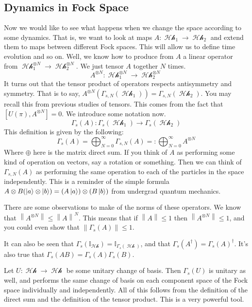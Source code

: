 \documentclass{article}
\DeclareMathOperator{\Hh}{\mathcal{Hh}}
\renewcommand{\norm}[1]{\left\lVert#1\right\rVert}
\begin{document}
\subsection{Dynamics in Fock Space}
Now we would like to see what happens when we change the space according to some dynamics. That is, we want to look at maps $A : \Hh_1 \to \Hh_2$ and extend them to maps between different Fock spaces. This will allow us to define time evolution and so on. Well, we know how to produce from $A$ a linear operator from $\Hh_1^{\otimes N} \to \Hh_2^{\otimes N}$. We just tensor $A$ together $N$ times.
\[A^{\otimes N} : \Hh^{\otimes N}_1 \to \Hh_2^{\otimes N}\]
It turns out that the tensor product of operators respects antisymmetry and symmetry. That is to say, $A^{\otimes N}(\Gamma_{s,N}(\Hh_1)) = \Gamma_{s,N}(\Hh_2)$. You may recall this from previous studies of tensors. This comes from the fact that $[U(\pi),A^{\otimes N}] = 0$. We introduce some notation now.
\begin{equation}
\Gamma_{s}(A) : \Gamma_{s}(\Hh_1) \to \Gamma_s(\Hh_2)
\end{equation}
This definition is given by the following:
\begin{equation}
\Gamma_s(A) = \bigoplus_{N=0}^\infty \Gamma_{s,N}(A) =: \bigoplus_{N=0}^\infty A^{\otimes N}
\end{equation}
Where $\oplus$ here is the matrix direct sum. If you think of $A$ as performing some kind of operation on vectors, say a rotation or something. Then we can think of $\Gamma_{s,N}(A)$ as performing the same operation to each of the particles in the space independently. This is a reminder of the simple formula $A\otimes B(\ket{a}\otimes\ket{b}) = (A\ket{a})\otimes(B\ket{b})$ from undergrad quantum mechanics.

There are some observations to make of the norms of these operators. We know that $\norm{A^{\otimes N}} \leq \norm{A}^N$. This means that if $\norm{A} \leq 1$ then $\norm{A^{\otimes N}} \leq 1$, and you could even show that $\norm{\Gamma_s(A)} \leq 1$.

It can also be seen that $\Gamma_s(\mathbb{I}_{\Hh}) = \mathbb{I}_{\Gamma_s(\Hh)}$, and that $\Gamma_s(A^\dagger) = \Gamma_s(A)^\dagger$. It's also true that $\Gamma_s(AB) = \Gamma_s(A)\Gamma_s(B)$.

Let $U : \Hh \to \Hh$ be some unitary change of basis. Then $\Gamma_s(U)$ is unitary as well, and performs the same change of basis on each component space of the Fock space individually and independently. All of this follows from the definition of the direct sum and the definition of the tensor product. This is a very powerful tool.
\end{document}
